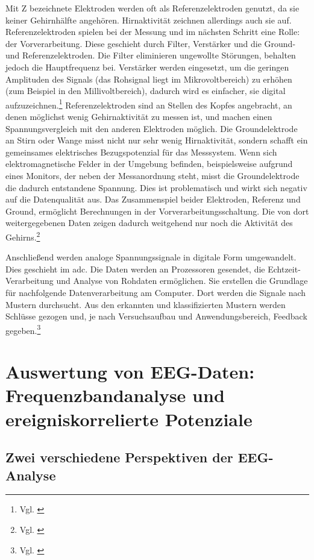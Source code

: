 Mit Z bezeichnete Elektroden werden oft als Referenzelektroden genutzt, da sie keiner Gehirnhälfte angehören. Hirnaktivität zeichnen allerdings auch sie auf.
Referenzelektroden spielen bei der Messung und im nächsten Schritt eine Rolle: der Vorverarbeitung. Diese geschieht durch Filter, Verstärker und die Ground- und Referenzelektroden.
Die Filter eliminieren ungewollte Störungen, behalten jedoch die Hauptfrequenz bei. Verstärker werden eingesetzt, um die geringen Amplituden des Signals (das Rohsignal liegt im Mikrovoltbereich) zu erhöhen (zum Beispiel in den Millivoltbereich), dadurch wird es einfacher, sie digital aufzuzeichnen.\footnote{Vgl. \cite[S.~8]{qin2023}} Referenzelektroden sind an Stellen des Kopfes angebracht, an denen möglichst wenig Gehirnaktivität zu messen ist, und machen einen Spannungsvergleich mit den anderen Elektroden möglich. Die Groundelektrode an Stirn oder Wange misst nicht nur sehr wenig Hirnaktivität, sondern schafft ein gemeinsames elektrisches Bezugspotenzial für das Messsystem. Wenn sich elektromagnetische Felder in der Umgebung befinden, beispielsweise aufgrund eines Monitors, der neben der Messanordnung steht, misst die Groundelektrode die dadurch entstandene Spannung. Dies ist problematisch und wirkt sich negativ auf die Datenqualität aus. Das Zusammenspiel beider Elektroden, Referenz und Ground, ermöglicht Berechnungen in der Vorverarbeitungsschaltung. Die von dort weitergegebenen Daten zeigen dadurch weitgehend nur noch die Aktivität des Gehirns.\footnote{Vgl. \cite{biopac_reference_ground}}

Anschließend werden analoge Spannungssignale in digitale Form umgewandelt. Dies geschieht im \acrshort{adc}. Die Daten werden an Prozessoren gesendet, die Echtzeit-Verarbeitung und Analyse von Rohdaten ermöglichen. Sie erstellen die Grundlage für nachfolgende Datenverarbeitung am Computer.
Dort werden die Signale nach Mustern durchsucht. Aus den erkannten und klassifizierten Mustern werden Schlüsse gezogen und, je nach Versuchsaufbau und Anwendungsbereich, Feedback gegeben.\footnote{Vgl. \cite[S.~7]{qin2023}}

\section{Auswertung von EEG-Daten: Frequenzbandanalyse und ereigniskorrelierte Potenziale}

\subsection{Zwei verschiedene Perspektiven der EEG-Analyse}
\label{sec:perspektiven}

